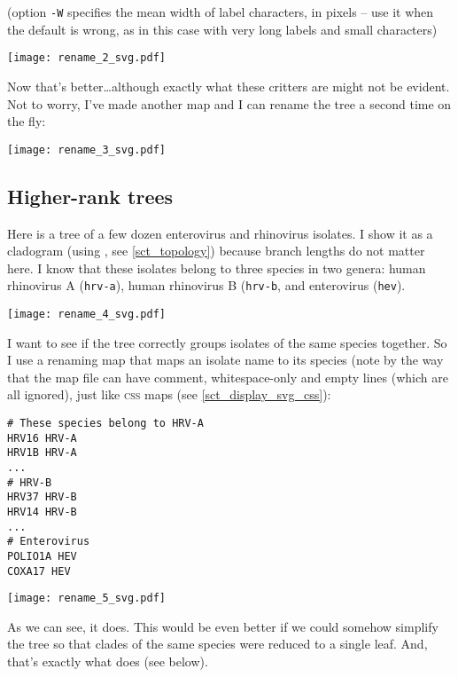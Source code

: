 
(option \texttt{-W} specifies the mean width of label characters, in
pixels -- use it when the default is wrong, as in this case with very long
labels and small characters)
\begin{center}
\texttt{[image: rename\_2\_svg.pdf]}
\end{center}

\noindent{}Now that's better\ldots although exactly what these critters are
might not be evident. Not to worry, I've made another map and I can rename the
tree a second time on the fly:


\begin{center}
\texttt{[image: rename\_3\_svg.pdf]}
\end{center}

\subsection{Higher-rank trees}
\label{sct_higher_rank}

Here is a tree of a few dozen enterovirus and rhinovirus isolates. I show it as
a cladogram (using \topology, see \ref{sct_topology}) because branch lengths do
not matter here. I know that these isolates belong to three species in two
genera: human rhinovirus A (\texttt{hrv-a}), human rhinovirus B
(\texttt{hrv-b}, and enterovirus (\texttt{hev}). 


\begin{center}
\texttt{[image: rename\_4\_svg.pdf]}
\end{center}

\noindent{}I want to see if the tree correctly groups isolates of the same
species together. So I use a renaming map that maps an isolate name to its
species (note by the way that the map file can have comment, whitespace-only
and empty lines (which are all ignored), just like \textsc{css} maps (see
\ref{sct_display_svg_css}):
\begin{verbatim}
# These species belong to HRV-A
HRV16 HRV-A
HRV1B HRV-A
...
# HRV-B
HRV37 HRV-B
HRV14 HRV-B
...
# Enterovirus
POLIO1A HEV
COXA17 HEV
\end{verbatim}


\begin{center}
\texttt{[image: rename\_5\_svg.pdf]}
\end{center}

\noindent{}As we can see, it does. This would be even better if we could
somehow simplify the tree so that clades of the same species were reduced to a
single leaf. And, that's exactly what \condense{} does (see below).
